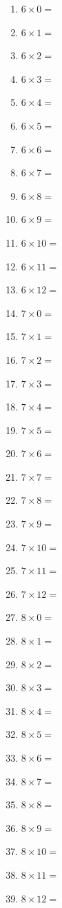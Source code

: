 \documentclass{article}
\begin{document}
\begin{multicols}{4}
\begin{enumerate}
\item $6 \times 0 =$
\item $6 \times 1 =$
\item $6 \times 2 =$
\item $6 \times 3 =$
\item $6 \times 4 =$
\item $6 \times 5 =$
\item $6 \times 6 =$
\item $6 \times 7 =$
\item $6 \times 8 =$
\item $6 \times 9 =$
\item $6 \times 10 =$
\item $6 \times 11 =$
\item $6 \times 12 =$

\item $7 \times 0 =$
\item $7 \times 1 =$
\item $7 \times 2 =$
\item $7 \times 3 =$
\item $7 \times 4 =$
\item $7 \times 5 =$
\item $7 \times 6 =$
\item $7 \times 7 =$
\item $7 \times 8 =$
\item $7 \times 9 =$
\item $7 \times 10 =$
\item $7 \times 11 =$
\item $7 \times 12 =$

\item $8 \times 0 =$
\item $8 \times 1 =$
\item $8 \times 2 =$
\item $8 \times 3 =$
\item $8 \times 4 =$
\item $8 \times 5 =$
\item $8 \times 6 =$
\item $8 \times 7 =$
\item $8 \times 8 =$
\item $8 \times 9 =$
\item $8 \times 10 =$
\item $8 \times 11 =$
\item $8 \times 12 =$


\end{enumerate}
\end{multicols}
\end{document}
